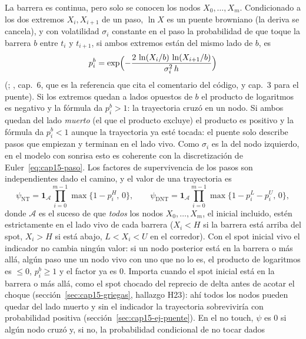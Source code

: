 La barrera es continua, pero solo se conocen los nodos $X_0,\dots,X_m$. Condicionado a los dos extremos $X_i,X_{i+1}$ de un paso,
$\ln X$ es un puente browniano (la deriva se cancela), y con volatilidad $\sigma_i$ constante en el paso la probabilidad de que
toque la barrera $b$ entre $t_i$ y $t_{i+1}$, si ambos extremos están del mismo lado de $b$, es
\begin{equation}\label{eq:cap15-puente}
  p_i^{b}=\exp\Bigl(-\frac{2\,\ln(X_i/b)\,\ln(X_{i+1}/b)}{\sigma_i^2\,h}\Bigr)
\end{equation}
(\citealt{beaglehole1997}; \citealt{glasserman2003}, cap.~6, que es la referencia que cita el comentario del código, y cap.~3 para el
puente). Si los extremos quedan a lados opuestos de $b$ el producto de logaritmos es negativo y la fórmula da $p_i^{b}>1$: la trayectoria
cruzó en un nodo. Si ambos quedan del lado \emph{muerto} (el que el producto excluye) el producto es positivo y la fórmula da $p_i^{b}<1$ aunque la trayectoria
ya esté tocada: el puente solo describe pasos que empiezan y terminan en el lado vivo. Como $\sigma_i$ es la del nodo izquierdo, en el modelo con sonrisa esto es coherente con la discretización de
Euler~\eqref{eq:cap15-paso}. Los factores de supervivencia de los pasos son independientes dado el camino, y el valor de una trayectoria es
\begin{equation}\label{eq:cap15-pi}
  \psi_{\mathrm{NT}}=\mathbf 1_{\mathcal A}\prod_{i=0}^{m-1}\max\bigl\{1-p_i^{H},\,0\bigr\},\qquad
  \psi_{\mathrm{DNT}}=\mathbf 1_{\mathcal A}\prod_{i=0}^{m-1}\max\bigl\{1-p_i^{L}-p_i^{U},\,0\bigr\},
\end{equation}
donde $\mathcal A$ es el suceso de que \emph{todos} los nodos $X_0,\dots,X_m$, el inicial incluido, estén estrictamente en el lado vivo de cada barrera
($X_i<H$ si la barrera está arriba del spot, $X_i>H$ si está abajo, $L<X_i<U$ en el corredor). Con el spot inicial vivo el indicador no cambia ningún valor:
si un nodo posterior está en la barrera o más allá, algún paso une un nodo vivo con uno que no lo es, el producto de logaritmos es $\le0$, $p_i^{b}\ge1$ y el
factor ya es $0$. Importa cuando el spot inicial está en la barrera o más allá, como el spot chocado del reprecio de delta antes de acotar el choque
(sección~\ref{sec:cap15-griegas}, hallazgo H23): ahí todos los nodos pueden quedar del lado muerto y sin el indicador la trayectoria sobreviviría con probabilidad positiva
(sección~\ref{sec:cap15-ej-puente}). En el no touch, $\psi$ es $0$ si algún nodo cruzó y, si no, la probabilidad condicional de no tocar dados
